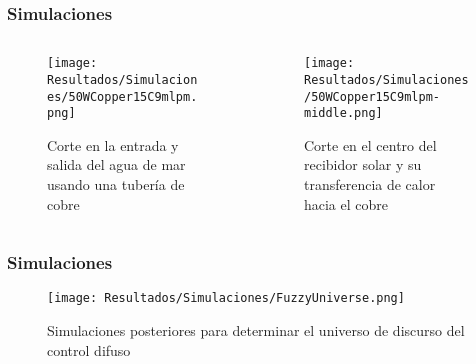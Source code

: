 	\begin{frame}
		\frametitle{Simulaciones}
		\vspace*{2mm}
		\begin{columns}
	    		\begin{column}{0.5\linewidth}
	    			\begin{figure}
	    				\texttt{[image: Resultados/Simulaciones/50WCopper15C9mlpm.png]}
	    				\caption{Corte en la entrada y salida del agua de mar usando una tubería de cobre}
	    			\end{figure}
		    \end{column}
		    \begin{column}{0.5\linewidth}
		    		\begin{figure}
	    				\texttt{[image: Resultados/Simulaciones/50WCopper15C9mlpm-middle.png]}
	    				\caption{Corte en el centro del recibidor solar y su transferencia de calor hacia el cobre}
	    			\end{figure}
		    \end{column}
	    \end{columns}
	\end{frame}
	
	\begin{frame}
		\frametitle{Simulaciones}
		\vspace*{2mm}
		\begin{figure}
    			\texttt{[image: Resultados/Simulaciones/FuzzyUniverse.png]}
    			\caption{Simulaciones posteriores para determinar el universo de discurso del control difuso}
  		\end{figure}
	\end{frame}
